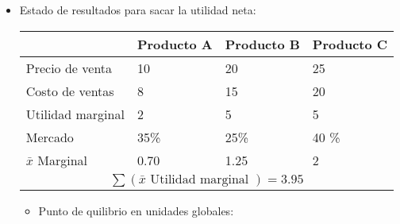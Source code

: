 \begin{itemize}
    
    \item Estado de resultados para sacar la utilidad neta:
        \begin{center}
           \begin{tabular}{ | p{3cm} | p{2cm} | p{2cm} | p{2cm} | }
               \hline
                    & Producto A & Producto B & Producto C    \\
               \hline
                    Precio de venta & 10 & 20 & 25 \\ 
                    Costo de ventas & 8 & 15 & 20 \\ 
                \hline
                    Utilidad marginal & 2 & 5 & 5 \\ 
                    Mercado & 35\% & 25\% & 40 \% \\ 
                \hline
                    $\bar{x}$ Marginal & 0.70 & 1.25 & 2 \\ \hline 
                    \multicolumn{4}{|c|}{$\sum (\bar{x} \text{  Utilidad marginal  }) = 3.95$} \\ 
                \hline
           \end{tabular}
        \end{center}
        \begin{itemize}
            \item Punto de quilibrio en unidades globales:
                \begin{center}
                \end{center}
        \end{itemize}
    

\end{itemize}
